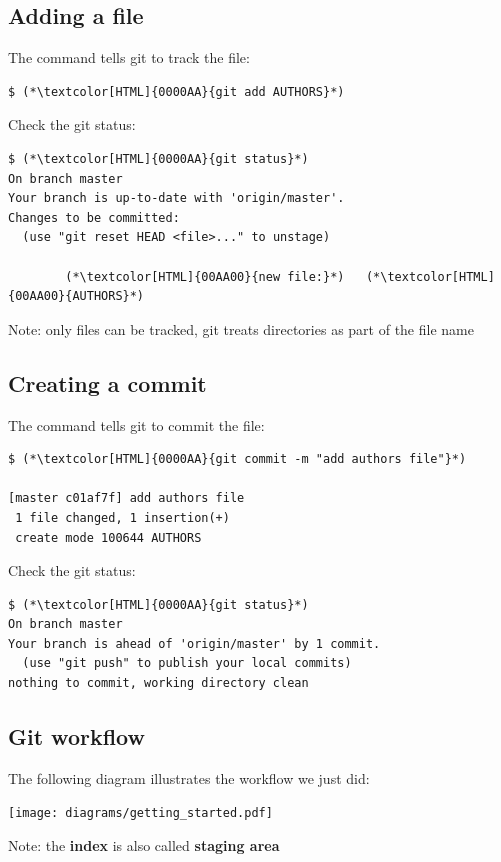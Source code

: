 \subsection{Adding a file}
\begin{frame}[fragile]
  \subslidetitle

  The command  tells git to track the file:
  \begin{lstlisting}
$ (*\textcolor[HTML]{0000AA}{git add AUTHORS}*)
\end{lstlisting}

  Check the git status:
  \begin{lstlisting}
$ (*\textcolor[HTML]{0000AA}{git status}*)
On branch master
Your branch is up-to-date with 'origin/master'.
Changes to be committed:
  (use "git reset HEAD <file>..." to unstage)

        (*\textcolor[HTML]{00AA00}{new file:}*)   (*\textcolor[HTML]{00AA00}{AUTHORS}*)
\end{lstlisting}

  \vspace{1em}
  Note: only files can be tracked, git treats directories as part of the file name
\end{frame}


\subsection{Creating a commit}
\begin{frame}[fragile]
  \subslidetitle

  The command  tells git to commit the file:
  \begin{lstlisting}
$ (*\textcolor[HTML]{0000AA}{git commit -m "add authors file"}*)

[master c01af7f] add authors file
 1 file changed, 1 insertion(+)
 create mode 100644 AUTHORS
\end{lstlisting}

  Check the git status:
  \begin{lstlisting}
$ (*\textcolor[HTML]{0000AA}{git status}*)
On branch master
Your branch is ahead of 'origin/master' by 1 commit.
  (use "git push" to publish your local commits)
nothing to commit, working directory clean
\end{lstlisting}
\end{frame}

\subsection{Git workflow}
\begin{frame}[fragile]
  \subslidetitle
  The following diagram illustrates the workflow we just did: \\
  \vspace{2em}
  \centerline{\texttt{[image: diagrams/getting\_started.pdf]}}

  \vspace{1em}
  Note: the \textbf{index} is also called \textbf{staging area}
\end{frame}


